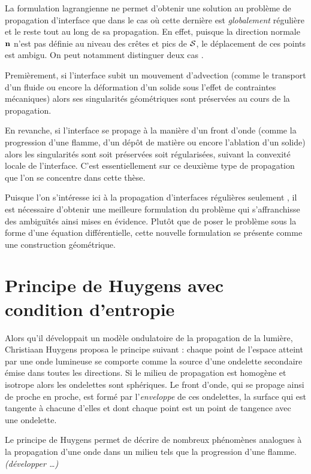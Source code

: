 \par\bigskip
La formulation lagrangienne ne permet d'obtenir une solution au problème de propagation d'interface que dans le cas où cette dernière est \textit{globalement} régulière et le reste tout au long de sa propagation. 
En effet, puisque la direction normale $\mathbf{n}$ n'est pas définie au niveau des crêtes et pics de $\mathcal{S}$, le déplacement de ces points est ambigu. 
On peut notamment distinguer deux cas \cite{jiao2007}.
\par
Premièrement, si l'interface subit un mouvement d'advection (comme le transport d'un fluide ou encore la déformation d'un solide sous l'effet de contraintes mécaniques) alors ses singularités géométriques sont préservées au cours de la propagation.
\par
En revanche, si l'interface se propage à la manière d'un front d'onde (comme la progression d'une flamme, d'un dépôt de matière ou encore l'ablation d'un solide) alors les singularités sont soit préservées soit régularisées, suivant la convexité locale de l'interface.
C'est essentiellement sur ce deuxième type de propagation que l'on se concentre dans cette thèse.
\par\bigskip
Puisque l'on s'intéresse ici à la propagation d'interfaces régulières seulement \piecewise, il est nécessaire d'obtenir une meilleure formulation du problème qui s'affranchisse des ambiguïtés ainsi mises en évidence. 
Plutôt que de poser le problème sous la forme d'une équation différentielle, cette nouvelle formulation se présente comme une construction géométrique.

\section{Principe de Huygens avec condition d'entropie}
\label{section:principe_huygens}
\def\p{\vit{p}}
\def\q{\vit{q}}
%
Alors qu'il développait un modèle ondulatoire de la propagation de la lumière, Christiaan Huygens proposa le principe suivant : chaque point de l'espace atteint par une onde lumineuse se comporte comme la source d'une ondelette secondaire émise dans toutes les directions. 
Si le milieu de propagation est homogène et isotrope alors les ondelettes sont sphériques. 
Le front d'onde, qui se propage ainsi de proche en proche, est formé par l'\textit{enveloppe} de ces ondelettes, \ie la surface qui est tangente à chacune d'elles et dont chaque point est un point de tangence avec une ondelette.
\par
Le principe de Huygens permet de décrire de nombreux phénomènes analogues à la propagation d'une onde dans un milieu tels que la progression d'une flamme. 
\textit{(développer \ldots)}

